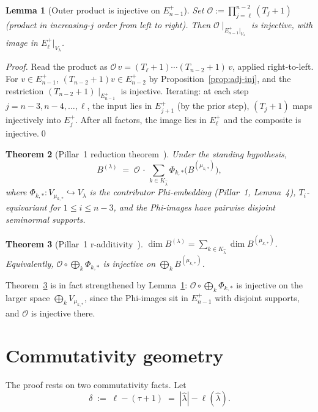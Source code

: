 \documentclass[11pt]{article}
\newtheorem{theorem}{Theorem}
\newtheorem{lemma}[theorem]{Lemma}
\theoremstyle{definition}
\newcommand{\Vlam}{V_\lambda}
\newcommand{\Bdec}{B^{(\lambda)}}
\newcommand{\hatl}{\widehat\lambda}
\newcommand{\elh}{\ell(\hatl)}
\newcommand{\Outer}{\mathcal{O}}
\begin{document}
\begin{lemma}[Outer product is injective on $E^+_{n-1}$]\label{lem:Outer-inj}
Set $\Outer := \prod_{j=\ell}^{n-2}(T_j+1)$ (product in increasing-$j$
order from left to right). Then $\Outer\!\mid_{E^+_{n-1}|_{\Vlam}}$ is
injective, with image in $E^+_\ell|_{\Vlam}$.
\end{lemma}

\begin{proof}
Read the product as $\Outer\,v = (T_\ell+1)\cdots(T_{n-2}+1)\,v$,
applied right-to-left. For $v \in E^+_{n-1}$,
$(T_{n-2}+1)v \in E^+_{n-2}$ by Proposition~\ref{prop:adj-inj}, and the
restriction $(T_{n-2}+1)\!\mid_{E^+_{n-1}}$ is injective. Iterating: at
each step $j = n-3, n-4, \ldots, \ell$, the input lies in $E^+_{j+1}$
(by the prior step), $(T_j+1)$ maps injectively into $E^+_j$. After
all factors, the image lies in $E^+_\ell$ and the composite is
injective.\qed
\end{proof}

\begin{theorem}[Pillar~1 reduction theorem~\cite{pillar1}]\label{thm:pillar1-red}
Under the standing hypothesis,
\[
   \Bdec \;=\; \Outer \,\cdot\, \sum_{k \in K_{\hatl}}
   \Phi_{k,*}\bigl(B^{(\mu_{k,*})}\bigr),
\]
where $\Phi_{k,*} : V_{\mu_{k,*}} \hookrightarrow \Vlam$ is the
contributor Phi-embedding (Pillar~1, Lemma~4), $T_i$-equivariant for
$1 \le i \le n-3$, and the Phi-images have pairwise disjoint
seminormal supports.
\end{theorem}

\begin{theorem}[Pillar~1 r-additivity~{\cite[Thm.~A]{r-add}}]\label{thm:r-add}
$\dim \Bdec = \sum_{k \in K_{\hatl}} \dim B^{(\mu_{k,*})}$.
Equivalently, $\Outer \circ \bigoplus_k \Phi_{k,*}$ is injective on
$\bigoplus_k B^{(\mu_{k,*})}$.
\end{theorem}

\noindent
Theorem~\ref{thm:r-add} is in fact strengthened by
Lemma~\ref{lem:Outer-inj}: $\Outer \circ \bigoplus_k \Phi_{k,*}$ is
injective on the larger space $\bigoplus_k V_{\mu_{k,*}}$, since the
Phi-images sit in $E^+_{n-1}$ with disjoint supports, and $\Outer$ is
injective there.

\section{Commutativity geometry}\label{sec:commutativity}

The proof rests on two commutativity facts. Let
\[
   \delta \;:=\; \ell - (\tau+1) \;=\; |\hatl| - \elh.
\]
\end{document}
